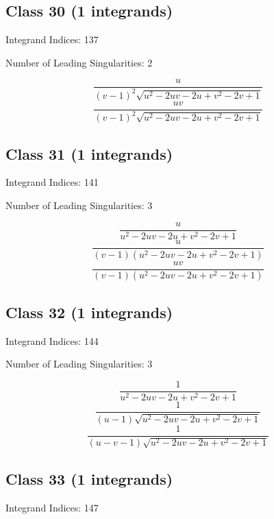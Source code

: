 \documentclass[11pt,a4paper]{article}
\begin{document}
\subsection*{Class 30 (1 integrands)}
Integrand Indices: 137

Number of Leading Singularities: 2

\begin{equation}
\frac{u}{(v-1)^2 \sqrt{u^2-2 u v-2 u+v^2-2 v+1}}
\end{equation}
\begin{equation}
\frac{u v}{(v-1)^2 \sqrt{u^2-2 u v-2 u+v^2-2 v+1}}
\end{equation}


\subsection*{Class 31 (1 integrands)}
Integrand Indices: 141

Number of Leading Singularities: 3

\begin{equation}
\frac{u}{u^2-2 u v-2 u+v^2-2 v+1}
\end{equation}
\begin{equation}
\frac{u}{(v-1) \left(u^2-2 u v-2 u+v^2-2 v+1\right)}
\end{equation}
\begin{equation}
\frac{u v}{(v-1) \left(u^2-2 u v-2 u+v^2-2 v+1\right)}
\end{equation}


\subsection*{Class 32 (1 integrands)}
Integrand Indices: 144

Number of Leading Singularities: 3

\begin{equation}
\frac{1}{u^2-2 u v-2 u+v^2-2 v+1}
\end{equation}
\begin{equation}
\frac{1}{(u-1) \sqrt{u^2-2 u v-2 u+v^2-2 v+1}}
\end{equation}
\begin{equation}
\frac{1}{(u-v-1) \sqrt{u^2-2 u v-2 u+v^2-2 v+1}}
\end{equation}


\subsection*{Class 33 (1 integrands)}
Integrand Indices: 147
\end{document}
